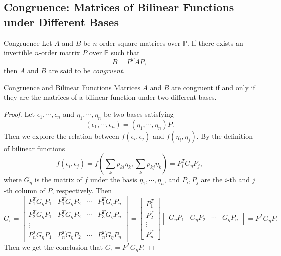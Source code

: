 \subsection{Congruence: Matrices of Bilinear Functions under Different Bases}

\begin{definition}{Congruence}{}
  Let $A$ and $B$ be $n$-order square matrices over $\mathbb{P}$.
  If there exists an invertible $n$-order matrix $P$ over $\mathbb{P}$ such that
  \begin{equation}
    B = P^T A P,
  \end{equation}
  then $A$ and $B$ are said to be \emph{congruent}.
\end{definition}

\begin{proposition}{Congruence and Bilinear Functions}{}
  Matrices $A$ and $B$ are congruent if and only if they are the matrices of
  a bilinear function under two different bases.
\end{proposition}

\begin{proof}
  Let $\epsilon_1,\cdots,\epsilon_n$ and $\eta_1,\cdots,\eta_n$ be two bases satisfying
  \begin{equation}
    (\epsilon_1,\cdots,\epsilon_n) = (\eta_1, \cdots, \eta_n) P.
  \end{equation}
  Then we explore the relation between $f(\epsilon_i, \epsilon_j)$ and
  $f(\eta_i, \eta_j)$.
  By the definition of bilinear functions
  \begin{equation}
    f(\epsilon_i, \epsilon_j) = f(\sum_k p_{ki}\eta_k, \sum_k p_{kj}\eta_k)
    = P_i^T G_{\eta} P_j,
  \end{equation}
  where $G_{\eta}$ is the matrix of $f$ under the basis $\eta_1,\cdots,\eta_n$,
  and $P_i, P_j$ are the $i$-th and $j$-th column of $P$, respectively.
  Then
  \begin{equation}
    G_{\epsilon} = \left[
      \begin{array}{cccc}
        P_1^T G_{\eta}P_1&P_1^T G_{\eta}P_2&\cdots&P_1^T G_{\eta}P_n\\
        P_2^T G_{\eta}P_1&P_2^T G_{\eta}P_2&\cdots&P_3^T G_{\eta}P_n\\
        \vdots\\
        P_n^T G_{\eta}P_1&P_n^T G_{\eta}P_2&\cdots&P_n^T G_{\eta}P_n
      \end{array}
    \right] = 
    \left[
      \begin{array}{c}
        P_1^T\\
        P_2^T\\
        \vdots\\
        P_n^T
      \end{array}
    \right] \left[
      \begin{array}{cccc}
        G_{\eta}P_1&G_{\eta}P_2&\cdots&G_{\eta}P_n
      \end{array}
    \right] = P^TG_{\eta}P.
  \end{equation}
  Then we get the conclusion that $G_{\epsilon} = P^TG_{\eta}P$.
\end{proof}

